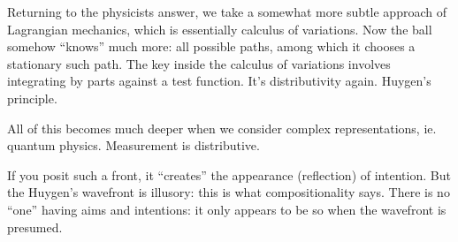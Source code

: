 \documentclass[11pt]{article}
\begin{document}
Returning to the physicists answer, we take a somewhat
more subtle approach of Lagrangian mechanics, which is
essentially calculus of variations. Now the ball somehow
``knows'' much more: all possible paths, among which it
chooses a stationary such path.
The key inside the calculus of variations involves integrating
by parts against a test function. It's distributivity again.
Huygen's principle.

All of this becomes much deeper when we consider complex
representations, ie. quantum physics.
Measurement is distributive.

If you posit such a front, it ``creates'' the appearance (reflection)
of intention. 
But the Huygen's wavefront is illusory: this is what compositionality says. 
There is no ``one'' having aims and intentions: it only appears to
be so when the wavefront is presumed.


{}

\end{document}
